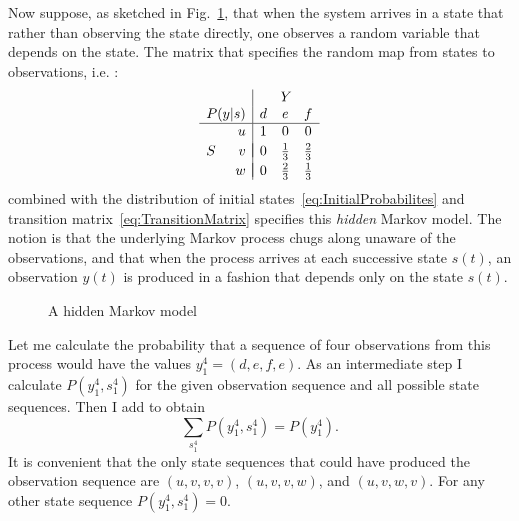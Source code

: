 \documentclass[]{article}
\newcommand{\ts}[3]{#1_{#2}^{#3}}                    %
\newcommand{\ti}[2]{{#1}{(#2)}}                  %
\newcommand{\ie}{i.e.\xspace}
\newcommand{\plotsize}{%
  \fontsize{9}{9}%
  \selectfont}
\renewcommand{\comment}[1]{}
\newcommand*{\inputfig}[2]{}
\newcommand*{\InputIntroductionFig}[1]{\inputfig{../figs/introduction}{#1}}
\begin{document}
%
Now suppose, as sketched in Fig.~\ref{fig:dhmm}, that when the system
arrives in a state that rather than observing the state directly, one
observes a random variable that depends on the state.  The matrix that
specifies the random map from states to observations, \ie%
:
\begin{equation*}
  \begin{array}{cr|ccc}
      &      &\multicolumn{3}{c}{Y} \\
      \multicolumn{2}{r|}{P(y|s)} & d & e           & f \\ %
      \hline%
      & u      & 1 & 0           & 0 \\
      &        & \vspace{-1 em} \\
    S & v      & 0 & \frac{1}{3} & \frac{2}{3} \\
      &        & \vspace{-1 em} \\
      & w      & 0 & \frac{2}{3} & \frac{1}{3}
  \end{array}%
\end{equation*}
combined with the distribution of initial
states~\eqref{eq:InitialProbabilites} and transition
matrix~\eqref{eq:TransitionMatrix} specifies this \emph{hidden} Markov
model.  The notion is that the underlying Markov process chugs along
unaware of the observations, and that when the process arrives at each
successive state $\ti{s}{t}$, an observation $\ti{y}{t}$ is produced
in a fashion that depends only on the state $\ti{s}{t}$.

\begin{figure}[htbp]
  \centering{\plotsize%
    \InputIntroductionFig{Markov_dhmm}
  }
  \caption[\comment{fig:Markov_dhmm }A hidden Markov model.]{A hidden
    Markov model}\label{fig:dhmm}
\end{figure}

Let me calculate the probability that a sequence of four observations
from this process would have the values $\ts{y}{1}{4} = (d,e,f,e)$.
As an intermediate step I calculate $P(\ts{y}{1}{4},\ts{s}{1}{4})$
for the given observation sequence and all possible state sequences.
Then I add to obtain
\begin{equation}
  \label{eq:dhmm_sum}
  \sum_{\ts{s}{1}{4}} P(\ts{y}{1}{4},\ts{s}{1}{4}) = P(\ts{y}{1}{4}).
\end{equation}
It is convenient that the only state sequences that could have
produced the observation sequence are $(u,v,v,v)$, $(u,v,v,w)$, and
$(u,v,w,v)$.  For any other state sequence
$P(\ts{y}{1}{4},\ts{s}{1}{4}) = 0$.
\end{document}
